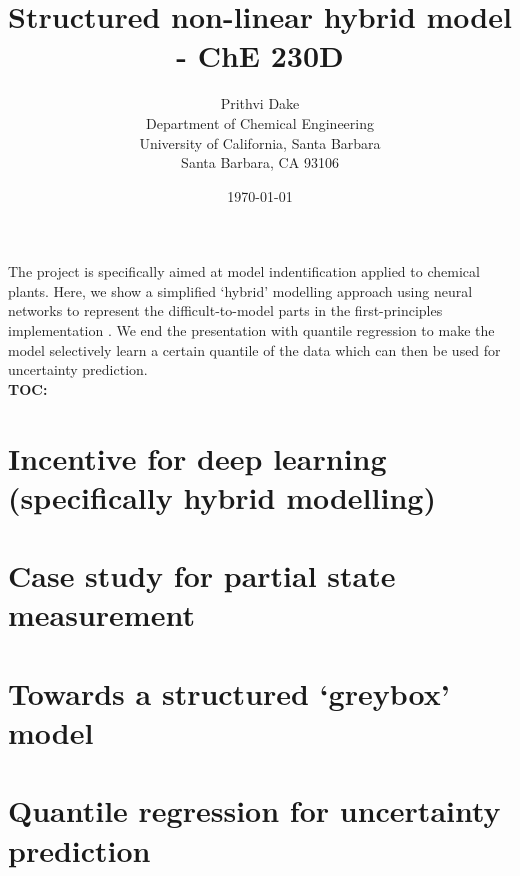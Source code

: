 \documentclass{article}
\title{Structured non-linear hybrid model - ChE 230D}
\author{Prithvi Dake\\
Department of Chemical Engineering\\
University of California, Santa  Barbara\\
Santa Barbara, CA 93106}
\date{\today}
\theoremstyle{definition}
\begin{document}
\maketitle
The project is specifically aimed at model indentification applied to chemical plants. Here, we show a simplified `hybrid' modelling approach using neural networks to represent the difficult-to-model parts in the first-principles implementation \citep{kumar:rawlings:2023a}. We end the presentation with quantile regression to make the model selectively learn a certain quantile of the data which can then be used for uncertainty prediction.\\
\newline
\textbf{TOC:}
\section{Incentive for deep learning (specifically hybrid modelling)}
\section{Case study for partial state measurement}
\section{Towards a structured `greybox' model}
\section{Quantile regression for uncertainty prediction}





\end{document}
